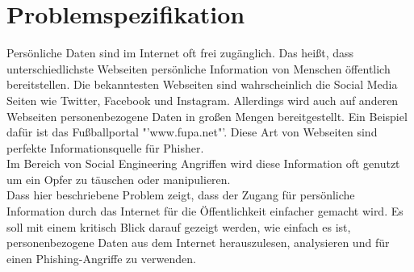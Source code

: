 

\chapter{Problemspezifikation}  %
\label{cha:Problemspezifikation} %
Persönliche Daten sind im Internet oft frei zugänglich. Das heißt, dass unterschiedlichste Webseiten persönliche Information von Menschen öffentlich bereitstellen. Die bekanntesten Webseiten sind wahrscheinlich die Social Media Seiten wie Twitter, Facebook und Instagram. Allerdings wird auch auf anderen Webseiten personenbezogene Daten in großen Mengen bereitgestellt. Ein Beispiel dafür ist das Fußballportal "'www.fupa.net"'. Diese Art von Webseiten sind perfekte Informationsquelle für Phisher.\\
Im Bereich von Social Engineering Angriffen wird diese Information oft genutzt um ein Opfer zu täuschen oder manipulieren.\\
Dass hier beschriebene Problem zeigt, dass der Zugang für persönliche Information durch das Internet für die Öffentlichkeit einfacher gemacht wird. Es soll mit einem kritisch Blick darauf gezeigt werden, wie einfach es ist, personenbezogene Daten aus dem Internet herauszulesen, analysieren und für einen Phishing-Angriffe zu verwenden.
